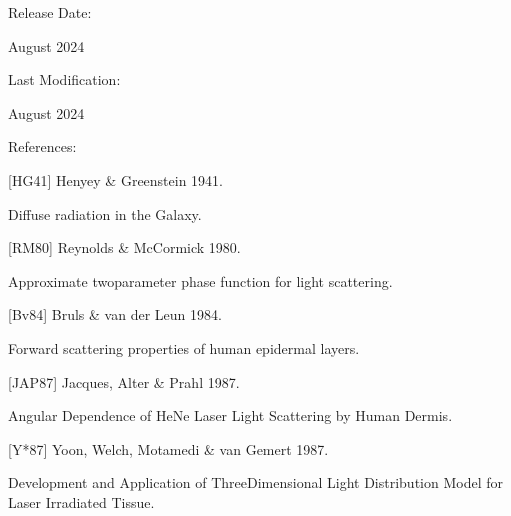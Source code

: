 \documentclass[letterpaper,10pt,english]{sphinxmanual}
\begin{document}
\begin{DUlineblock}{0em}
\item[] Release Date:
\item[] August 2024
\item[] Last Modification:
\item[] August 2024
\end{DUlineblock}

\begin{DUlineblock}{0em}
\item[] References:
\end{DUlineblock}

\begin{DUlineblock}{0em}
\item[] {[}HG41{]} Henyey \& Greenstein 1941.
\item[] Diffuse radiation in the Galaxy.
\item[] 
\end{DUlineblock}

\begin{DUlineblock}{0em}
\item[] {[}RM80{]} Reynolds \& McCormick 1980.
\item[] Approximate two\sphinxhyphen{}parameter phase function for light scattering.
\item[] 
\end{DUlineblock}

\begin{DUlineblock}{0em}
\item[] {[}Bv84{]} Bruls \& van der Leun 1984.
\item[] Forward scattering properties of human epidermal layers.
\item[] 
\end{DUlineblock}

\begin{DUlineblock}{0em}
\item[] {[}JAP87{]} Jacques, Alter \& Prahl 1987.
\item[] Angular Dependence of HeNe Laser Light Scattering by Human Dermis.
\item[] 
\end{DUlineblock}

\begin{DUlineblock}{0em}
\item[] {[}Y*87{]} Yoon, Welch, Motamedi \& van Gemert 1987.
\item[] Development and Application of Three\sphinxhyphen{}Dimensional Light Distribution Model for Laser Irradiated Tissue.
\item[] 
\end{DUlineblock}
\end{document}
